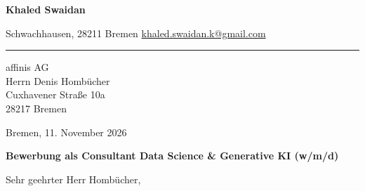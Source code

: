 





    {\fontsize{22}{26}\selectfont
    \bfseries\color{navy}Khaled Swaidan}
\par

\vspace{3pt}

{\small\color{muted}
Schwachhausen, 28211 Bremen
\quad\textbullet\quad
\href{mailto:khaled.swaidan.k@gmail.com}
{khaled.swaidan.k@gmail.com}
}
\par

\vspace{8pt}

{\color{line}\rule{\linewidth}{1pt}}
\par

\vspace{6mm}


{\small\color{muted}
affinis AG\\
Herrn Denis Hombücher\\
Cuxhavener Straße 10a\\
28217 Bremen
}
\par

\vspace{3mm}

\begin{flushright}
    {\small\color{muted}
    Bremen, 11. November 2026
    }
\end{flushright}

\vspace{2mm}


{\large\bfseries\color{navy}
Bewerbung als Consultant
Data Science \& Generative KI (w/m/d)
}
\par

\vspace{5mm}


Sehr geehrter Herr Hombücher,

